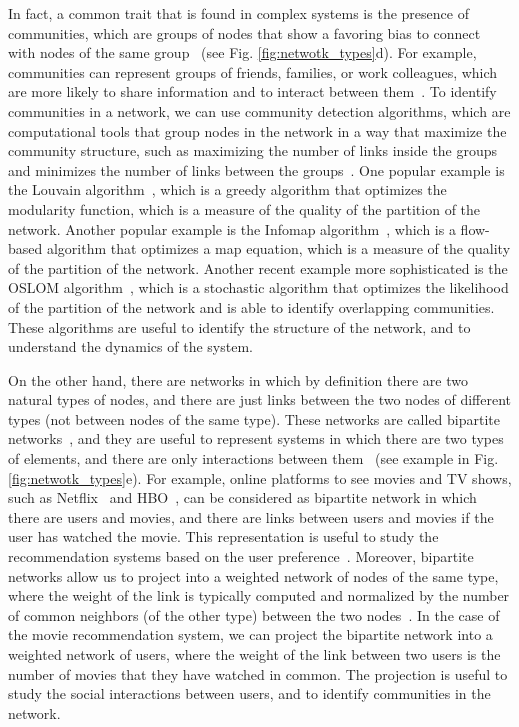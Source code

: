 In fact, a common trait that is found in complex systems is the presence of communities, which are groups of nodes that show a favoring bias to connect with nodes of the same group~\cite{girvan-2002} (see Fig. \ref{fig:netwotk_types}d). For example, communities can represent groups of friends, families, or work colleagues, which are more likely to share information and to interact between them~\cite{newman2003structure}. To identify communities in a network, we can use community detection algorithms, which are computational tools that group nodes in the network in a way that maximize the community structure, such as maximizing the number of links inside the groups and minimizes the number of links between the groups~\cite{lancichinetti-2008,fortunato2010community}. One popular example is the Louvain algorithm~\cite{blondel-2008}, which is a greedy algorithm that optimizes the modularity function, which is a measure of the quality of the partition of the network. Another popular example is the Infomap algorithm~\cite{rosvall-2008}, which is a flow-based algorithm that optimizes a map equation, which is a measure of the quality of the partition of the network. Another recent example more sophisticated is the OSLOM algorithm~\cite{OSLOM}, which is a stochastic algorithm that optimizes the likelihood of the partition of the network and is able to identify overlapping communities. These algorithms are useful to identify the structure of the network, and to understand the dynamics of the system.

On the other hand, there are networks in which by definition there are two natural types of nodes, and there are just links between the two nodes of different types (not between nodes of the same type). These networks are called bipartite networks~\cite{newman2003structure}, and they are useful to represent systems in which there are two types of elements, and there are only interactions between them~\cite{latapy-2008} (see example in Fig. \ref{fig:netwotk_types}e). For example, online platforms to see movies and TV shows, such as Netflix~\cite{netflix} and HBO~\cite{HBO}, can be considered as bipartite network in which there are users and movies, and there are links between users and movies if the user has watched the movie. This representation is useful to study the recommendation systems based on the user preference~\cite{ricci-2011}. Moreover, bipartite networks allow us to project into a weighted network of nodes of the same type, where the weight of the link is typically computed and normalized by the number of common neighbors (of the other type) between the two nodes~\cite{newman-2001-collaboration}. In the case of the movie recommendation system, we can project the bipartite network into a weighted network of users, where the weight of the link between two users is the number of movies that they have watched in common. The projection is useful to study the social interactions between users, and to identify communities in the network.

